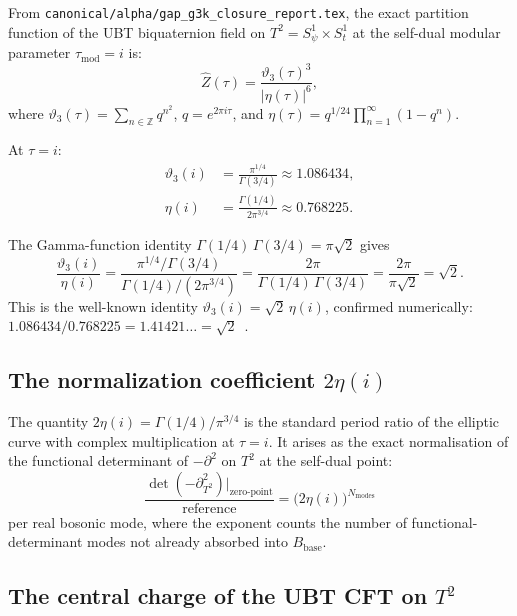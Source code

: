\documentclass[12pt,a4paper]{article}
\theoremstyle{definition}
\theoremstyle{remark}
\newcommand{\ZZ}{\mathbb{Z}}
\begin{document}
From \texttt{canonical/alpha/gap\_g3k\_closure\_report.tex}, the exact
partition function of the UBT biquaternion field on $T^2 = S^1_\psi \times S^1_t$
at the self-dual modular parameter $\tau_{\mathrm{mod}} = i$ is:
\begin{equation}
  \hat{Z}(\tau) = \frac{\vartheta_3(\tau)^3}{|\eta(\tau)|^6},
  \label{eq:cw:Zhat}
\end{equation}
where $\vartheta_3(\tau) = \sum_{n \in \ZZ} q^{n^2}$, $q = e^{2\pi i\tau}$,
and $\eta(\tau) = q^{1/24} \prod_{n=1}^\infty (1 - q^n)$.

At $\tau = i$:
\begin{align}
  \vartheta_3(i) &= \frac{\pi^{1/4}}{\Gamma(3/4)} \approx 1.086434, \label{eq:cw:th3i} \\
  \eta(i)        &= \frac{\Gamma(1/4)}{2\pi^{3/4}} \approx 0.768225. \label{eq:cw:etai}
\end{align}

The Gamma-function identity $\Gamma(1/4)\,\Gamma(3/4) = \pi\sqrt{2}$ gives
\begin{equation}
  \frac{\vartheta_3(i)}{\eta(i)}
  = \frac{\pi^{1/4}/\Gamma(3/4)}{\Gamma(1/4)/(2\pi^{3/4})}
  = \frac{2\pi}{\Gamma(1/4)\,\Gamma(3/4)}
  = \frac{2\pi}{\pi\sqrt{2}} = \sqrt{2}.
  \label{eq:cw:ratio}
\end{equation}
This is the well-known identity $\vartheta_3(i) = \sqrt{2}\,\eta(i)$, confirmed
numerically: $1.086434/0.768225 = 1.41421\ldots = \sqrt{2}$~\checkmark.

\subsection{The normalization coefficient $2\eta(i)$}

The quantity $2\eta(i) = \Gamma(1/4)/\pi^{3/4}$ is the standard period ratio
of the elliptic curve with complex multiplication at $\tau = i$.  It arises
as the exact normalisation of the functional determinant of $-\partial^2$ on
$T^2$ at the self-dual point:
\begin{equation}
  \frac{\det(-\partial^2_{T^2})|_{\text{zero-point}}}{\text{reference}}
  = \bigl(2\eta(i)\bigr)^{N_{\mathrm{modes}}}
  \label{eq:cw:detnorm}
\end{equation}
per real bosonic mode, where the exponent counts the number of functional-
determinant modes not already absorbed into $B_{\mathrm{base}}$.

\subsection{The central charge of the UBT CFT on $T^2$}
\end{document}
